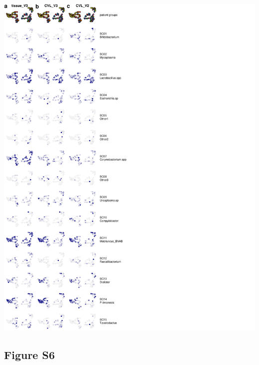 \documentclass[
]{article}
\begin{document}
\includegraphics[width=1\linewidth]{manuscript_template_files/figure-latex/unnamed-chunk-15-1}

\clearpage

\hypertarget{figure-s6}{%
\subsection{Figure S6}\label{figure-s6}}
\end{document}
